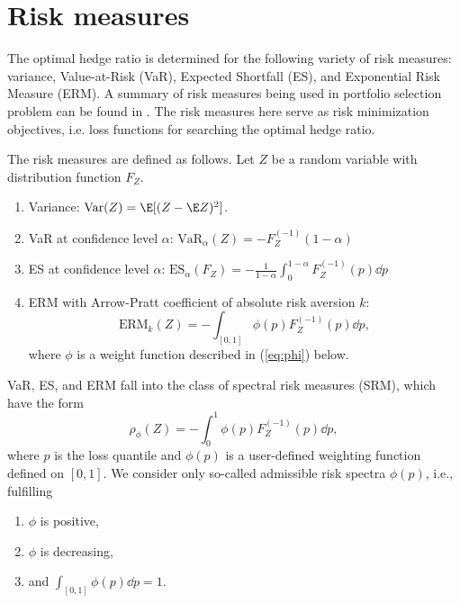 \section{Risk measures}\label{subsec:spectral-risk-measures}
The optimal hedge ratio is determined for the following variety of risk measures: variance, Value-at-Risk (VaR), Expected Shortfall (ES), and Exponential Risk Measure (ERM).
A summary of risk measures being used in portfolio selection problem
can be found in \citet{hardle2008applied}. 
The risk measures here serve as risk minimization objectives, i.e. loss functions for searching the optimal hedge ratio. 

The risk measures are defined as follows.
Let $Z$ be a random
variable with distribution function $F_Z$.
\begin{enumerate}
\item Variance: $\text{Var}(Z) = \E[(Z-\E Z)^2]$. 
\item VaR at confidence level $\alpha$: $\text{VaR}_\alpha(Z) = -F_{Z}^{(-1)}(1-\alpha)$
\item ES at confidence level $\alpha$: $\text{ES}_\alpha(F_Z) = -\frac{1}{1-\alpha}\int_0^{1-\alpha}F_Z^{(-1)}(p)\dd p$
\item ERM with Arrow-Pratt coefficient of absolute risk
  aversion $k$:
  \begin{equation*}
    \text{ERM}_k(Z) = -\int_{[0,1]}\phi(p) F_Z^{(-1)}(p)\dd p,
  \end{equation*}
  where $\phi$ is a weight function described in (\ref{eq:phi}) below.
\end{enumerate}

VaR, ES, and ERM fall into the class of spectral risk measures (SRM),
which have the form \citep{Acerbi2002}%
\begin{equation*}
  \rho_\phi(Z) = - \int_0^1 \phi(p) F_{Z}^{(-1)}(p)\dd p,
\end{equation*}
where $p$ is the loss quantile and $\phi(p)$ is a user-defined
weighting function defined on $[0,1]$.
We consider only so-called admissible risk spectra $\phi(p)$, i.e.,
fulfilling %
\begin{enumerate}[label=(\roman*)]
\item $\phi$ is positive,
\item $\phi$ is decreasing,
\item and $\int_{[0,1]}\phi(p)\dd p=1$. 
\end{enumerate}


